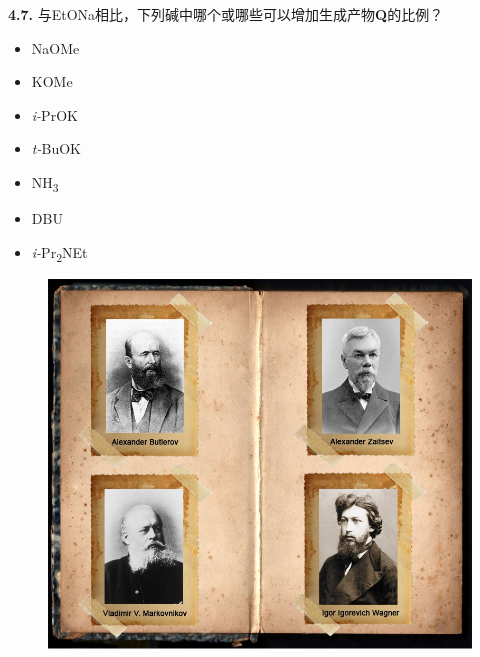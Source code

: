 \noindent\textbf{4.7.}
与EtONa相比，下列碱中哪个或哪些可以增加生成产物\textbf{Q}的比例？

\renewcommand{\labelitemi}{$\square$}
\begin{itemize}
	\item NaOMe
	\item KOMe
	\item \emph{i-}PrOK
	\item \emph{t-}BuOK
	\item NH\textsubscript{3}
	\item DBU
	\item \emph{i-}Pr\textsubscript{2}NEt
\end{itemize}
\renewcommand{\labelitemi}{$\bullet$}

\begin{figure}[h!]
	\centering
	\includegraphics[width=12cm]{./pic/t4-1.jpg}
\end{figure}
